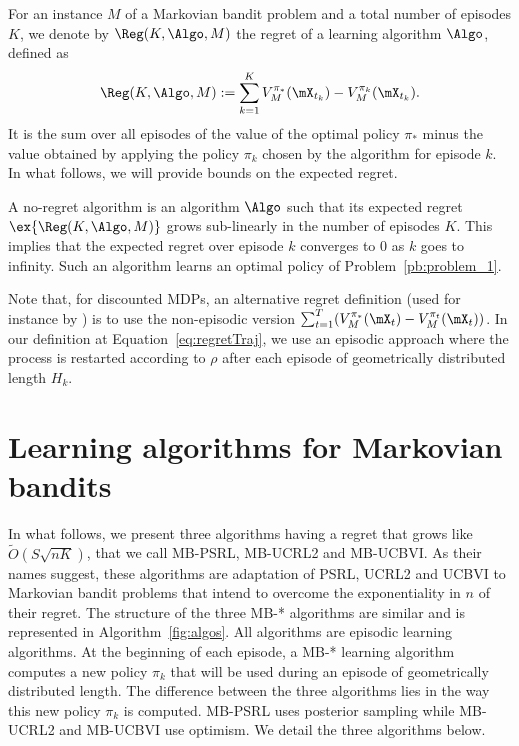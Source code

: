 For an  instance \(M\) of a Markovian bandit problem and a total number of
episodes $K$, we denote by $\Reg(K,\Algo,M)$ the regret of a
learning algorithm \(\Algo\), defined as
\begin{align}
  \Reg(K,\Algo,M) :=  \sum_{k=1}^K %
      V^{\pi_*}_M(\mX_{t_k}) - V^{\pi_k}_M(\mX_{t_k})%
      .\label{eq:regretTraj}
\end{align}
It is the sum over all episodes of the value of the optimal policy $\pi_*$ minus the value obtained by applying the policy $\pi_k$ chosen by the algorithm for episode $k$. In what follows, we will provide bounds on the expected regret.

A no-regret algorithm is an algorithm $\Algo$ such that its expected regret $\ex{\Reg(K,\Algo,M)}$ grows sub-linearly in the number of episodes $K$. This implies that the expected regret over episode $k$  converges to $0$ as $k$ goes to infinity. Such an algorithm learns an optimal policy of Problem~\ref{pb:problem_1}.

Note that, for discounted MDPs, an alternative regret definition (used for instance by \cite{zhou2021nearly}) is to use the non-episodic version $\sum_{t=1}^T (V^{\pi_*}_M(\mX_{t}) - V^{\pi_t}_M(\mX_{t}))$. In our definition at Equation~\eqref{eq:regretTraj}, we use an episodic approach where the process is restarted according to $\rho$ after each episode of geometrically distributed length $H_k$.

\section{Learning algorithms for Markovian bandits}
\label{sec:learning_algorithms}

In what follows, we present three algorithms having a regret that grows like $\tilde{O}(S\sqrt{nK})$, that we call MB-PSRL, MB-UCRL2 and MB-UCBVI. As their names suggest, these algorithms are adaptation of PSRL, UCRL2 and UCBVI to Markovian bandit problems that intend to overcome the exponentiality in $n$ of their regret. The structure of the three MB-* algorithms are similar and is represented in Algorithm~\ref{fig:algos}. All algorithms are episodic learning algorithms. At the beginning of each episode, a MB-* learning algorithm computes a new policy $\pi_k$ that will be used during an episode of geometrically distributed length. The difference between the three algorithms lies in the way this new policy $\pi_k$ is computed. MB-PSRL uses posterior sampling while MB-UCRL2 and MB-UCBVI use optimism. We detail the three algorithms below. 

